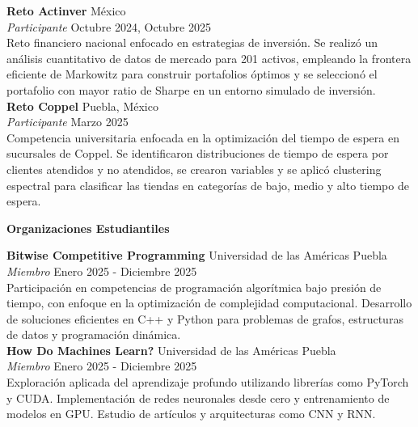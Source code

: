 \documentclass[8pt]{extarticle} %
\begin{document}
\textbf{Reto Actinver} \hfill México\\  
\textit{Participante} \hfill Octubre 2024, Octubre 2025\\
Reto financiero nacional enfocado en estrategias de inversión. Se realizó un análisis cuantitativo de datos de mercado para 201 activos, empleando la frontera eficiente de Markowitz para construir portafolios óptimos y se seleccionó el portafolio con mayor ratio de Sharpe en un entorno simulado de inversión.\\

\textbf{Reto Coppel} \hfill Puebla, México\\  
\textit{Participante} \hfill Marzo 2025\\  
Competencia universitaria enfocada en la optimización del tiempo de espera en sucursales de Coppel. Se identificaron distribuciones de tiempo de espera por clientes atendidos y no atendidos, se crearon variables y se aplicó clustering espectral para clasificar las tiendas en categorías de bajo, medio y alto tiempo de espera. \\








\newpage


\begin{center}
\vspace{1ex}
\textbf{Organizaciones Estudiantiles}
\vspace{-1ex}
\end{center}

\textbf{Bitwise Competitive Programming} \hfill Universidad de las Américas Puebla\\
\textit{Miembro} \hfill Enero 2025 - Diciembre 2025\\
Participación en competencias de programación algorítmica bajo presión de tiempo, con enfoque en la optimización de complejidad computacional. Desarrollo de soluciones eficientes en C++ y Python para problemas de grafos, estructuras de datos y programación dinámica. \\

\textbf{How Do Machines Learn?} \hfill Universidad de las Américas Puebla\\
\textit{Miembro} \hfill Enero 2025 - Diciembre 2025\\
Exploración aplicada del aprendizaje profundo utilizando librerías como PyTorch y CUDA. Implementación de redes neuronales desde cero y entrenamiento de modelos en GPU. Estudio de artículos y arquitecturas como CNN y RNN. \\
\end{document}
